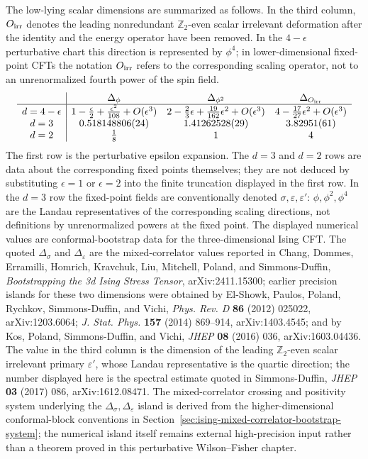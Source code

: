 The low-lying scalar dimensions are summarized as follows.  In the third
column, \(O_{\rm irr}\) denotes the leading nonredundant
\(\mathbb Z_2\)-even scalar irrelevant deformation after the identity and the
energy operator have been removed.  In the \(4-\epsilon\) perturbative chart
this direction is represented by \(\phi^4\); in lower-dimensional fixed-point
CFTs the notation \(O_{\rm irr}\) refers to the corresponding scaling operator,
not to an unrenormalized fourth power of the spin field.
\[
  \begin{array}{c|ccc}
    & \Delta_\phi & \Delta_{\phi^2} & \Delta_{O_{\rm irr}} \\
    \hline
    d=4-\epsilon
      & 1-\frac{\epsilon}{2}
        +\frac{\epsilon^2}{108}+O(\epsilon^3)
      & 2-\frac{2}{3}\epsilon
        +\frac{19}{162}\epsilon^2+O(\epsilon^3)
      & 4-\frac{17}{27}\epsilon^2+O(\epsilon^3) \\
    d=3
      & 0.518148806(24)
      & 1.41262528(29)
      & 3.82951(61) \\
    d=2
      & \frac18
      & 1
      & 4
  \end{array}
\]
The first row is the perturbative epsilon expansion.  The \(d=3\) and \(d=2\)
rows are data about the corresponding fixed points themselves; they are not
deduced by substituting \(\epsilon=1\) or \(\epsilon=2\) into the finite
truncation displayed in the first row.  In the \(d=3\) row the fixed-point
fields are conventionally denoted
\(\sigma,\varepsilon,\varepsilon'\): \(\phi,\phi^2,\phi^4\) are the Landau
representatives of the corresponding scaling directions, not definitions by
unrenormalized powers at the fixed point.  The displayed numerical values are
conformal-bootstrap data for the three-dimensional Ising CFT.  The quoted
\(\Delta_\sigma\) and \(\Delta_\varepsilon\) are the mixed-correlator values
reported in Chang, Dommes, Erramilli, Homrich, Kravchuk, Liu, Mitchell,
Poland, and Simmons-Duffin, \emph{Bootstrapping the 3d Ising Stress Tensor},
arXiv:2411.15300; earlier precision islands for these two dimensions were
obtained by El-Showk, Paulos, Poland, Rychkov, Simmons-Duffin, and Vichi,
\emph{Phys. Rev. D} \textbf{86} (2012) 025022, arXiv:1203.6064;
\emph{J. Stat. Phys.} \textbf{157} (2014) 869--914, arXiv:1403.4545; and by
Kos, Poland, Simmons-Duffin, and Vichi, \emph{JHEP} \textbf{08} (2016) 036,
arXiv:1603.04436.  The value in the third column is the dimension of the
leading \(\mathbb Z_2\)-even scalar irrelevant primary \(\varepsilon'\), whose
Landau representative is the quartic direction; the number displayed here is
the spectral estimate quoted in Simmons-Duffin, \emph{JHEP} \textbf{03}
  (2017) 086, arXiv:1612.08471.  The mixed-correlator crossing and positivity
system underlying the \(\Delta_\sigma,\Delta_\varepsilon\) island is derived
from the higher-dimensional conformal-block conventions in
Section~\ref{sec:ising-mixed-correlator-bootstrap-system}; the numerical
island itself remains external high-precision input rather than a theorem
proved in this perturbative Wilson--Fisher chapter.

